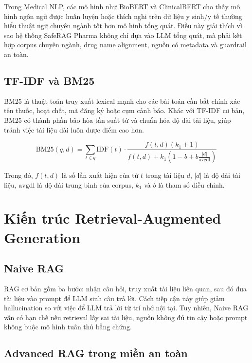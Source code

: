 Trong Medical NLP, các mô hình như BioBERT và ClinicalBERT cho thấy mô hình ngôn ngữ được huấn luyện hoặc thích nghi trên dữ liệu y sinh/y tế thường hiểu thuật ngữ chuyên ngành tốt hơn mô hình tổng quát. Điều này giải thích vì sao hệ thống SafeRAG Pharma không chỉ dựa vào LLM tổng quát, mà phải kết hợp corpus chuyên ngành, drug name alignment, nguồn có metadata và guardrail an toàn.

\subsection{TF-IDF và BM25}

BM25 là thuật toán truy xuất lexical mạnh cho các bài toán cần bắt chính xác tên thuốc, hoạt chất, mã đăng ký hoặc cụm cảnh báo. Khác với TF-IDF cơ bản, BM25 có thành phần bão hòa tần suất từ và chuẩn hóa độ dài tài liệu, giúp tránh việc tài liệu dài luôn được điểm cao hơn.

\begin{formulabox}[Điểm BM25]
\[
\mathrm{BM25}(q,d)=
\sum_{t\in q}
\mathrm{IDF}(t)
\cdot
\frac{f(t,d)(k_1+1)}
{f(t,d)+k_1\left(1-b+b\frac{|d|}{\mathrm{avgdl}}\right)}
\]
\end{formulabox}

Trong đó, \(f(t,d)\) là số lần xuất hiện của từ \(t\) trong tài liệu \(d\), \(|d|\) là độ dài tài liệu, \(\mathrm{avgdl}\) là độ dài trung bình của corpus, \(k_1\) và \(b\) là tham số điều chỉnh.

\section{Kiến trúc Retrieval-Augmented Generation}

\subsection{Naive RAG}

RAG cơ bản gồm ba bước: nhận câu hỏi, truy xuất tài liệu liên quan, sau đó đưa tài liệu vào prompt để LLM sinh câu trả lời. Cách tiếp cận này giúp giảm hallucination so với việc để LLM trả lời từ trí nhớ nội tại. Tuy nhiên, Naive RAG vẫn có hạn chế nếu retrieval lấy sai tài liệu, nguồn không đủ tin cậy hoặc prompt không buộc mô hình tuân thủ bằng chứng.

\subsection{Advanced RAG trong miền an toàn}

